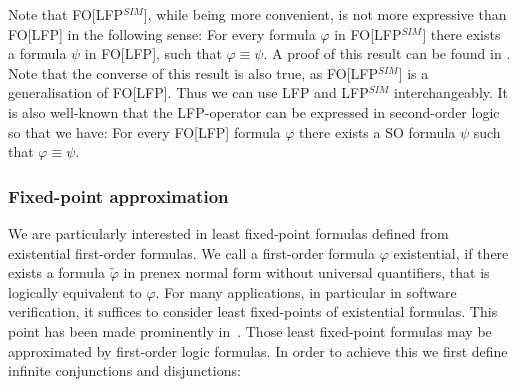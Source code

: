 \documentclass[acmsmall]{acmart}
\theoremstyle{plain}
\newtheorem{theorem}{Theorem}
\newtheorem{lemma}[theorem]{Lemma}
\theoremstyle{definition}
\newcommand{\calL}{\mathcal{L}}
\newcommand{\mybar}[1]{\overline{#1}}
\newcommand{\impl}{\rightarrow} %
\newcommand{\lfp}{\mathrm{lfp}} %
\begin{document}
Note that  FO[LFP$^{SIM}$], while being more convenient, is not more expressive than FO[LFP]
 in the following sense:
For every formula $\varphi$ in FO[LFP$^{SIM}]$ there exists a formula $\psi$ in FO[LFP],
 such that $\varphi \equiv \psi.$
A proof of this result can be found in \cite{Libkin2004}.
%
%
Note that the converse of this result is also true, as FO[LFP$^{SIM}]$ is a generalisation
 of FO[LFP].
Thus we can use LFP and LFP$^{SIM}$ interchangeably.
It is also well-known that the LFP-operator can be expressed in second-order logic so that we have:  For every FO[LFP] formula $\varphi$
 there exists a SO formula $\psi$ such that $\varphi  \equiv \psi$.

%


\subsubsection{Fixed-point approximation}\label{sec.prelim.approximation}
We are particularly interested in least fixed-point formulas defined from existential first-order formulas.
We call a first-order formula $\varphi$ existential, if there exists a formula $\tilde{\varphi}$ in
prenex normal form without universal quantifiers, that is logically equivalent to $\varphi$.
For many applications, in particular in software verification, it suffices to consider least fixed-points
of existential formulas.
This point has been made prominently in~\cite{Blass87Existential}.
Those least fixed-point formulas may be approximated by first-order logic formulas. In order to achieve this we first define infinite conjunctions and disjunctions:
\end{document}

